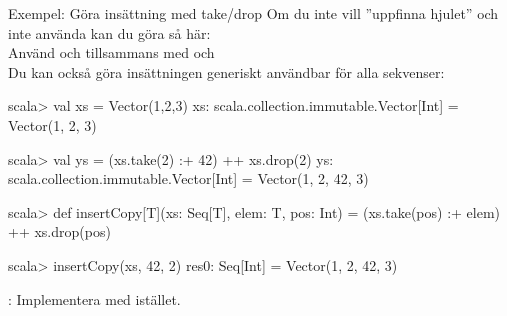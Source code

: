 \begin{Slide}{Exempel: Göra insättning med take/drop}\SlideFontSmall
Om du inte vill ''uppfinna hjulet'' och inte använda  kan du göra så här: \\Använd  och  tillsammans med \code{:+} och \code{++} \\Du kan också göra insättningen generiskt användbar för alla sekvenser:
\begin{REPLnonum}
scala> val xs = Vector(1,2,3)
xs: scala.collection.immutable.Vector[Int] = 
  Vector(1, 2, 3)

scala> val ys = (xs.take(2) :+ 42) ++ xs.drop(2)
ys: scala.collection.immutable.Vector[Int] = 
  Vector(1, 2, 42, 3)
  
scala> def insertCopy[T](xs: Seq[T], elem: T, pos: Int) = 
        (xs.take(pos) :+ elem) ++ xs.drop(pos)

scala> insertCopy(xs, 42, 2)
res0: Seq[Int] = Vector(1, 2, 42, 3)
  
\end{REPLnonum}
: Implementera  med  istället.
\end{Slide}


\fi







